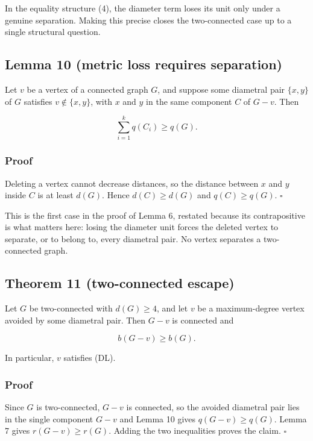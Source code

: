 \documentclass[
  11pt,
  letterpaper,
]{article}
\begin{document}
In the equality structure (4), the diameter term loses its unit only
under a genuine separation. Making this precise closes the two-connected
case up to a single structural question.

\subsection{Lemma 10 (metric loss requires
separation)}\label{lemma-10-metric-loss-requires-separation}

Let \(v\) be a vertex of a connected graph \(G\), and suppose some
diametral pair \(\{x,y\}\) of \(G\) satisfies \(v\notin\{x,y\}\), with
\(x\) and \(y\) in the same component \(C\) of \(G-v\). Then

\[
\sum_{i=1}^k q(C_i)\ge q(G).
\]

\subsubsection{Proof}\label{proof-9}

Deleting a vertex cannot decrease distances, so the distance between
\(x\) and \(y\) inside \(C\) is at least \(d(G)\). Hence
\(d(C)\ge d(G)\) and \(q(C)\ge q(G)\). \(\square\)

This is the first case in the proof of Lemma 6, restated because its
contrapositive is what matters here: losing the diameter unit forces the
deleted vertex to separate, or to belong to, every diametral pair. No
vertex separates a two-connected graph.

\subsection{Theorem 11 (two-connected
escape)}\label{theorem-11-two-connected-escape}

Let \(G\) be two-connected with \(d(G)\ge4\), and let \(v\) be a
maximum-degree vertex avoided by some diametral pair. Then \(G-v\) is
connected and

\[
b(G-v)\ge b(G).
\]

In particular, \(v\) satisfies (DL).

\subsubsection{Proof}\label{proof-10}

Since \(G\) is two-connected, \(G-v\) is connected, so the avoided
diametral pair lies in the single component \(G-v\) and Lemma 10 gives
\(q(G-v)\ge q(G)\). Lemma 7 gives \(r(G-v)\ge r(G)\). Adding the two
inequalities proves the claim. \(\square\)
\end{document}
